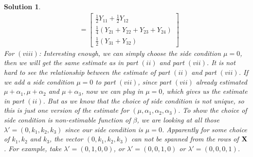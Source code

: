 \documentclass[11pt]{article}
\newtheorem{sol}{Solution}
\begin{document}
\begin{sol}
\begin{align*}
		&= \left[\begin{array}{c} \frac{1}{2}Y_{11} + \frac{1}{2}Y_{12}\\ \frac{1}{4}(Y_{21} + Y_{22} + Y_{23} + Y_{24})\\ \frac{1}{2}(Y_{31} + Y_{32})\end{array}\right]
	\end{align*}
	For $(viii)$:\vskip 2mm
	Interesting enough, we can simply choose the side condition $\mu = 0$, then we will get the same estimate as in part $(ii)$ and part $(vii)$.\vskip 2mm
	It is not hard to see the relationship between the estimate of part $(ii)$ and part $(vii)$. If we add a side condition $\mu = 0$ to part $(vii)$, since part $(vii)$ already estimated $\mu + \alpha_1, \mu + \alpha_2$ and $\mu + \alpha_3$, now we can plug in $\mu = 0$, which gives us the estimate in part $(ii)$. But as we know that the choice of side condition is not unique, so this is just one version of the estimate for $(\mu, \alpha_1, \alpha_2, \alpha_3)$.\vskip 2mm
	To show the choice of side condition is non-estimable function of $\beta$, we are looking at all those $\lambda' = (0, k_1, k_2, k_3)$ since our side condition is $\mu = 0$. Apparently for some choice of $k_1, k_2$ and $k_3$, the vector $(0, k_1,k_2,k_3)$ can not be spanned from the rows of ${\bf X}$. For example, take $\lambda' = (0, 1, 0, 0)$, or $\lambda' = (0, 0, 1, 0)$ or $\lambda' = (0, 0, 0, 1)$.
\end{sol}
\end{document}
